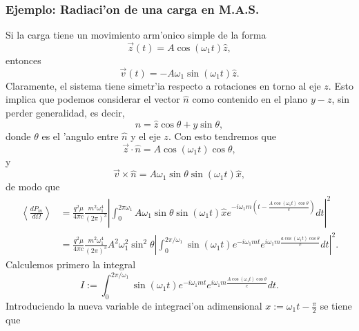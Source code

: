 \subsubsection{Ejemplo: Radiaci'on de una carga en M.A.S.}

Si la carga tiene un movimiento arm'onico simple de la forma
\begin{equation}
\vec{z}(t) =A\cos(\omega_1t)\hat{z},
\end{equation}
entonces
\begin{equation}
\vec{v}(t) =-A\omega_1\sin(\omega_1t)\hat{z}.
\end{equation}
Claramente, el sistema tiene simetr'ia respecto a rotaciones en torno al eje
$z$. Esto implica que podemos considerar el vector $\hat{n}$ como contenido en
el plano $y-z$, sin perder generalidad, es decir,
\begin{equation}
\hat{n}=\hat{z}\cos\theta+\hat{y}\sin\theta,
\end{equation}
donde $\theta$ es el 'angulo entre $\hat{n}$ y el eje $z$. Con esto tendremos
que
\begin{equation}
 \vec{z}\cdot\hat{n}=A\cos(\omega_1t)\cos\theta ,
\end{equation}
y
\begin{equation}
\vec{v}\times\hat{n}=A\omega_1\sin\theta\sin(\omega_1t)  \hat{x},
\end{equation}
de modo que
\begin{align}
\left\langle \frac{dP_{m}}{d\Omega}\right\rangle &=
\frac{q^2\mu}{4\pi c}\frac{m^2\omega_1^4}{\left(2\pi\right)^3}
\left| \int_0^{2\pi\omega_1}A\omega_1\sin\theta\sin\left(\omega_1t\right)
\hat{x}e^{-i\omega_1m\left(t-\frac{A\cos\left(\omega_1t\right)\cos\theta}{c}\right)}dt\right|^2\\
&=\frac{q^2\mu}{4\pi c}\frac{m^2\omega_1^4}{\left(2\pi\right)^3}
A^2\omega_1^2\sin^2\theta\left| \int_0^{2\pi/\omega_1}\sin\left(
\omega_1t\right) e^{-i\omega_1mt}e^{i\omega_1m\frac{a\cos\left(
\omega_1t\right)  \cos\theta}{c}}dt\right|^2 .  \label{promedioantescvar}
\end{align}
Calculemos primero la integral
\begin{equation}
I:=\int_0^{2\pi/\omega_1}\sin\left(\omega_1t\right)
e^{-i\omega_1mt}e^{i\omega_1m\frac{A\cos\left(  \omega_1t\right)
\cos\theta}{c}}dt.
\end{equation}
Introduciendo la nueva variable de integraci'on adimensional
$x:=\omega_1t-\frac{\pi}{2}$ se tiene que
